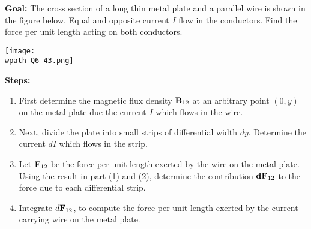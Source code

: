 \documentclass[../../header.tex]{subfiles}
\begin{document}
\textbf{Goal:} The cross section of a long thin metal plate and a parallel wire is shown in the figure below. Equal and opposite current $I$ flow in the conductors. Find the force per unit length acting on both conductors.
\begin{center}
\texttt{[image: \\wpath Q6-43.png]}
\end{center}
\textbf{Steps:} 
\begin{enumerate}
\item First determine the magnetic flux density $\mathbf{B}_{12}$ at an arbitrary point $(0,y)$ on the metal plate due the current $I$ which flows in the wire.%


\item Next, divide the plate into small strips of differential width $dy$. Determine the current $dI$ which flows in the strip.%


\item Let $\mathbf{F}_{12}$ be the force per unit length exerted by the wire on the metal plate.  Using the result in part (1) and (2), determine the contribution $\mathbf{dF}_{12}$ to the force due to each differential strip.


\item Integrate $d\mathbf{F}_{12}$, to compute the force per unit length exerted by the current carrying wire on the metal plate.


\end{enumerate}
\end{document}
